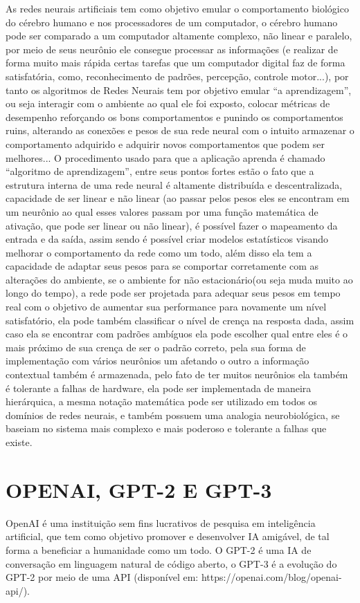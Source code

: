 As redes neurais artificiais tem como objetivo emular o comportamento biológico do cérebro humano e nos processadores de um computador, o cérebro humano pode ser comparado a um computador altamente complexo, não linear e paralelo, por meio de seus neurônio ele consegue processar as informações (e realizar de forma muito mais rápida certas tarefas que um computador digital faz de forma satisfatória, como, reconhecimento de padrões, percepção, controle motor...), por tanto os algoritmos de Redes Neurais tem por objetivo emular “a aprendizagem”, ou seja interagir com o ambiente ao qual ele foi exposto, colocar métricas de desempenho reforçando os bons comportamentos e punindo os comportamentos ruins, alterando as conexões e pesos de sua rede neural com o intuito armazenar o comportamento adquirido e adquirir novos comportamentos que podem ser melhores...  
O procedimento usado para que a aplicação aprenda é chamado “algoritmo de aprendizagem”, entre seus pontos fortes estão o fato que a estrutura interna de uma rede neural é altamente distribuída e descentralizada, capacidade de ser linear e não linear (ao passar pelos pesos eles se encontram em um neurônio ao qual esses valores passam por uma função matemática de ativação, que pode ser linear ou não linear), é possível fazer o mapeamento da entrada e da saída, assim sendo é possível criar modelos estatísticos visando melhorar o comportamento da rede como um todo, além disso ela tem a capacidade de adaptar seus pesos para se comportar corretamente com as alterações do ambiente, se o ambiente for não estacionário(ou seja muda muito ao longo do tempo), a rede pode ser projetada para adequar seus pesos em tempo real com o objetivo de aumentar sua performance para novamente um nível satisfatório, ela pode também classificar o nível de crença na resposta dada, assim caso ela se encontrar com padrões ambíguos ela pode escolher qual entre eles é o mais próximo de sua crença de ser o padrão correto, pela sua forma de implementação com vários neurônios um afetando o outro a informação contextual também é armazenada, pelo fato de ter muitos neurônios ela também é tolerante a falhas de hardware, ela pode ser implementada de maneira hierárquica, a mesma notação matemática pode ser utilizado em todos os domínios de redes neurais, e também possuem uma analogia neurobiológica, se baseiam no sistema mais complexo e mais poderoso e tolerante a falhas que existe. 

\section{OPENAI, GPT-2 E GPT-3}
\label{sec:OPENAI}

OpenAI é uma instituição sem fins lucrativos de pesquisa em inteligência artificial, que tem como objetivo promover e desenvolver IA amigável, de tal forma a beneficiar a humanidade como um todo. 
O GPT-2 é uma IA de conversação em linguagem natural de código aberto, o GPT-3 é a evolução do GPT-2 por meio de uma API (disponível em: https://openai.com/blog/openai-api/). 
